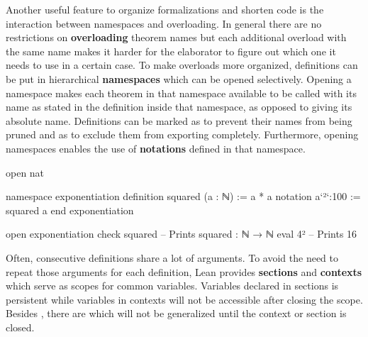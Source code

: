 Another useful feature to organize formalizations and shorten code is the interaction
between namespaces and overloading.
In general there are no restrictions on \textbf{overloading} theorem names but each additional
overload with the same name makes it harder for the elaborator to figure out which
one it needs to use in a certain case.
To make overloads more organized, definitions can be put in hierarchical \textbf{namespaces}
which can be opened selectively.
Opening a namespace makes each theorem in that namespace available to be called
with its name as stated in the definition inside that namespace, as opposed to
giving its absolute name.
Definitions can be marked as  to prevent their names from being
pruned and as  to exclude them from exporting completely.
Furthermore, opening namespaces enables the use of \textbf{notations} defined
in that namespace.
\begin{leancode}
open nat

namespace exponentiation
  definition squared (a : ℕ) := a * a
  notation a`²`:100 := squared a
end exponentiation

open exponentiation
check squared -- Prints squared : ℕ → ℕ
eval 4² -- Prints 16
\end{leancode}
Often, consecutive definitions share a lot of arguments.
To avoid the need to repeat those arguments for each definition, Lean provides
\textbf{sections} and \textbf{contexts} which serve as scopes for common variables.
Variables declared in sections is persistent while variables in contexts will not
be accessible after closing the scope.
Besides , there are  which will not be generalized
until the context or section is closed.


